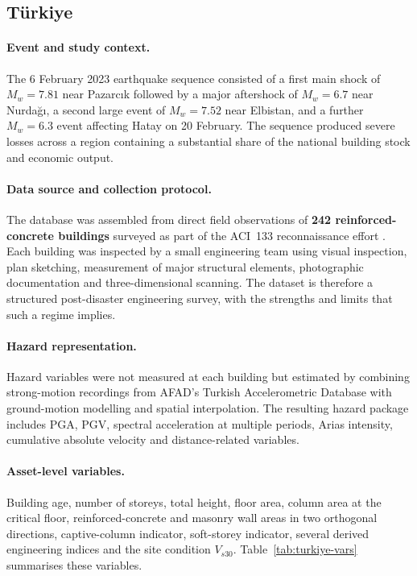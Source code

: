 \documentclass[11pt,a4paper]{article}
\begin{document}
\subsection{T\"urkiye}
\label{sec:data-turkiye}

\paragraph{Event and study context.} The 6 February 2023 earthquake sequence consisted of a first main shock of $M_w = 7.81$ near Pazarc{\i}k followed by a major aftershock of $M_w = 6.7$ near Nurda\u{g}{\i}, a second large event of $M_w = 7.52$ near Elbistan, and a further $M_w = 6.3$ event affecting Hatay on 20 February. The sequence produced severe losses across a region containing a substantial share of the national building stock and economic output.

\paragraph{Data source and collection protocol.} The database was assembled from direct field observations of \textbf{242 reinforced-concrete buildings} surveyed as part of the ACI~133 reconnaissance effort \citep{hariri2025turkiye}. Each building was inspected by a small engineering team using visual inspection, plan sketching, measurement of major structural elements, photographic documentation and three-dimensional scanning. The dataset is therefore a structured post-disaster engineering survey, with the strengths and limits that such a regime implies.

\paragraph{Hazard representation.} Hazard variables were not measured at each building but estimated by combining strong-motion recordings from AFAD's Turkish Accelerometric Database with ground-motion modelling and spatial interpolation. The resulting hazard package includes PGA, PGV, spectral acceleration at multiple periods, Arias intensity, cumulative absolute velocity and distance-related variables.

\paragraph{Asset-level variables.} Building age, number of storeys, total height, floor area, column area at the critical floor, reinforced-concrete and masonry wall areas in two orthogonal directions, captive-column indicator, soft-storey indicator, several derived engineering indices and the site condition $V_{s30}$. Table~\ref{tab:turkiye-vars} summarises these variables.
\end{document}
